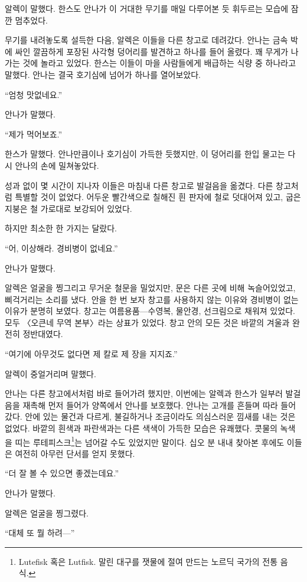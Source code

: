 알렉이 말했다. 한스도 안나가 이 거대한 무기를 매일 다루어본 듯 휘두르는 모습에 잠깐 멈추었다.

무기를 내려놓도록 설득한 다음, 알렉은 이들을 다른 창고로 데려갔다. 안나는 금속 박에 싸인 깔끔하게 포장된 사각형 덩어리를 발견하고 하나를 들어 올렸다. 꽤 무게가 나가는 것에 놀라고 있었다. 한스는 이들이 마을 사람들에게 배급하는 식량 중 하나라고 말했다. 안나는 결국 호기심에 넘어가 하나를 열어보았다.

``엄청 맛없네요.''

안나가 말했다.

``제가 먹어보죠.''

한스가 말했다. 안나만큼이나 호기심이 가득한 듯했지만, 이 덩어리를 한입 물고는 다시 안나의 손에 밀쳐놓았다.

성과 없이 몇 시간이 지나자 이들은 마침내 다른 창고로 발걸음을 옮겼다. 다른 창고처럼 특별할 것이 없었다. 어두운 빨간색으로 칠해진 흰 판자에 철로 덧대어져 있고, 굽은 지붕은 철 가로대로 보강되어 있었다.

하지만 최소한 한 가지는 달랐다.

``어, 이상해라. 경비병이 없네요.''

안나가 말했다.

알렉은 얼굴을 찡그리고 무거운 철문을 밀었지만, 문은 다른 곳에 비해 녹슬어있었고, 삐걱거리는 소리를 냈다. 안을 한 번 보자 창고를 사용하지 않는 이유와 경비병이 없는 이유가 분명히 보였다. 창고는 여름용품—수영복, 물안경, 선크림으로 채워져 있었다. 모두 〈오큰네 무역 본부〉라는 상표가 있었다. 창고 안의 모든 것은 바깥의 겨울과 완전히 정반대였다.

``여기에 아무것도 없다면 제 칼로 제 장을 지지죠.''

알렉이 중얼거리며 말했다.

안나는 다른 창고에서처럼 바로 들어가려 했지만, 이번에는 알렉과 한스가 일부러 발걸음을 재촉해 먼저 들어가 양쪽에서 안나를 보호했다. 안나는 고개를 흔들며 따라 들어갔다. 안에 있는 물건과 다르게, 불길하거나 조금이라도 의심스러운 낌새를 내는 것은 없었다. 바깥의 흰색과 파란색과는 다른 색색이 가득한 모습은 유쾌했다. 콧물의 녹색을 띠는 루테피스크\footnote{Lutefisk 혹은 Lutfisk. 말린 대구를 잿물에 절여 만드는 노르딕 국가의 전통 음식.}는 넘어갈 수도 있었지만 말이다. 십오 분 내내 찾아본 후에도 이들은 여전히 아무런 단서를 얻지 못했다.

``더 잘 볼 수 있으면 좋겠는데요.''

안나가 말했다.

알렉은 얼굴을 찡그렸다.

``대체 또 뭘 하려—''

